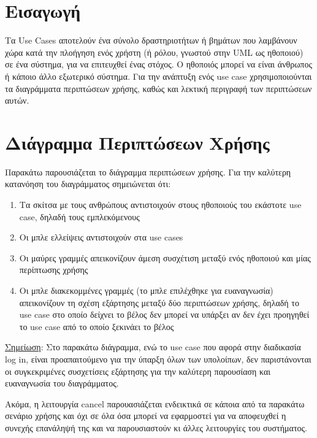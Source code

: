 \documentclass{article}
\begin{document}
{
  \hypersetup{linkcolor=black}
  \tableofcontents
}

\newpage

\section{Εισαγωγή}

Τα Use Cases αποτελούν ένα σύνολο δραστηριοτήτων ή βημάτων που λαμβάνουν χώρα κατά την πλοήγηση ενός χρήστη (ή ρόλου, γνωστού στην UML ως ηθοποιού) σε ένα σύστημα, για να επιτευχθεί ένας στόχος. Ο ηθοποιός μπορεί να είναι άνθρωπος ή κάποιο άλλο εξωτερικό σύστημα. 
Για την ανάπτυξη ενός use case χρησιμοποιούνται τα διαγράμματα περιπτώσεων χρήσης, καθώς και λεκτική περιγραφή των περιπτώσεων αυτών.

\section{Διάγραμμα Περιπτώσεων Χρήσης}

Παρακάτω παρουσιάζεται το διάγραμμα περιπτώσεων χρήσης. Για την καλύτερη κατανόηση του διαγράμματος σημειώνεται ότι:

\begin{enumerate}
  \item Τα σκίτσα με τους ανθρώπους αντιστοιχούν στους ηθοποιούς του εκάστοτε use case, δηλαδή τους εμπλεκόμενους
  \item Οι μπλε ελλείψεις αντιστοιχούν στα use cases
  \item Οι μαύρες γραμμές απεικονίζουν άμεση συσχέτιση μεταξύ ενός ηθοποιού και μίας περίπτωσης χρήσης
  \item Οι μπλε διακεκομμένες γραμμές (το μπλε επιλέχθηκε για ευαναγνωσία) απεικονίζουν τη σχέση εξάρτησης μεταξύ δύο περιπτώσεων χρήσης, δηλαδή το use case στο οποίο δείχνει το βέλος δεν μπορεί να υπάρξει αν δεν έχει προηγηθεί το use case από το οποίο ξεκινάει το βέλος  
\end{enumerate}


\underline{Σημείωση}: Στο παρακάτω διάγραμμα, ενώ το use case που αφορά στην διαδικασία log in, είναι προαπαιτούμενο για την ύπαρξη όλων των υπολοίπων, δεν παριστάνονται οι συγκεκριμένες συσχετίσεις εξάρτησης για την καλύτερη παρουσίαση και ευαναγνωσία του διαγράμματος.
\par Ακόμα, η λειτουργία cancel παρουασιάζεται ενδεικτικά σε κάποια από τα παρακάτω σενάριο χρήσης και όχι σε όλα όσα μπορεί να εφαρμοστεί για να αποφευχθεί η συνεχής επανάληψή της και να παρουσιαστούν κι άλλες λειτουργίες του συστήματος.
\end{document}
